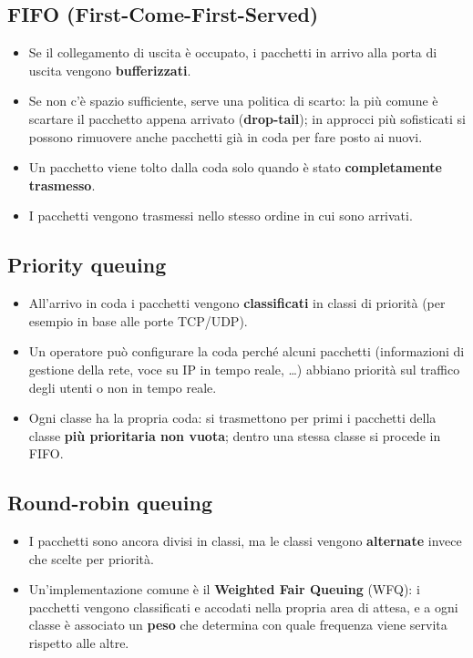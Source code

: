 \subsection{FIFO (First-Come-First-Served)}

\begin{itemize}
    \item Se il collegamento di uscita è occupato, i pacchetti in arrivo alla porta di uscita vengono \textbf{bufferizzati}.
    \item Se non c'è spazio sufficiente, serve una politica di scarto: la più comune è scartare il pacchetto appena arrivato
          (\textbf{drop-tail}); in approcci più sofisticati si possono rimuovere anche pacchetti già in coda per fare posto ai nuovi.
    \item Un pacchetto viene tolto dalla coda solo quando è stato \textbf{completamente trasmesso}.
    \item I pacchetti vengono trasmessi nello stesso ordine in cui sono arrivati.
\end{itemize}

\subsection{Priority queuing}

\begin{itemize}
    \item All'arrivo in coda i pacchetti vengono \textbf{classificati} in classi di priorità (per esempio in base alle porte TCP/UDP).
    \item Un operatore può configurare la coda perché alcuni pacchetti (informazioni di gestione della rete, voce su IP in
          tempo reale, \dots) abbiano priorità sul traffico degli utenti o non in tempo reale.
    \item Ogni classe ha la propria coda: si trasmettono per primi i pacchetti della classe \textbf{più prioritaria non vuota};
          dentro una stessa classe si procede in FIFO.
\end{itemize}

\subsection{Round-robin queuing}

\begin{itemize}
    \item I pacchetti sono ancora divisi in classi, ma le classi vengono \textbf{alternate} invece che scelte per priorità.
    \item Un'implementazione comune è il \textbf{Weighted Fair Queuing} (WFQ): i pacchetti vengono classificati e accodati
          nella propria area di attesa, e a ogni classe è associato un \textbf{peso} che determina con quale frequenza viene
          servita rispetto alle altre.
\end{itemize}

